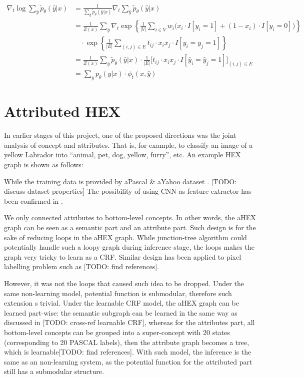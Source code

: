 \documentclass[11pt,a4paper]{article}
\begin{document}
\begin{align*}
\nabla_t\log\sum_{\hat{y}}\tilde{p}_\theta(\hat{y}|x)&=\frac{1}{\sum_{\hat{y}}\tilde{p}_\theta(\hat{y}|x)}\nabla_t\sum_{\hat{y}}\tilde{p}_\theta(\hat{y}|x)\\
&=\frac{1}{Z(x)}\sum_{\hat{y}}\nabla_t\exp\left\{\frac{1}{|V|}\sum_{i\in V}w_i\big(x_i\cdot I[y_i=1]+(1-x_i)\cdot I[y_i=0]\big)\right\}\\
&\quad\cdot\exp\left\{\frac{1}{|E|}\sum_{(i,j)\in E}t_{ij}\cdot x_ix_j\cdot I[y_i=y_j=1]\right\}\\
&=\frac{1}{Z(x)}\sum_{\hat{y}}\tilde{p}_\theta(\hat{y}|x)\cdot\frac{1}{|E|}\Big[t_{ij}\cdot x_ix_j\cdot I[\hat{y}_i=\hat{y}_j=1]\Big]_{(i,j)\in E}\\
&=\sum_{\hat{y}}p_\theta(\hat{y}|x)\cdot\phi_t(x,\hat{y})
\end{align*}

\appendix
\section{Attributed HEX}

In earlier stages of this project, one of the proposed directions was the joint analysis of concept and attributes. That is, for example, to classify an image of a yellow Labrador into ``animal, pet, dog, yellow, furry'', etc. An example HEX graph is shown as follows:

While the training data is provided by aPascal \& aYahoo dataset \cite{farhadi2009describing}. [TODO: discuss dataset properties] The possibility of using CNN as feature extractor has been confirmed in \cite{razavian2014cnn}.

We only connected attributes to bottom-level concepts. In other words, the aHEX graph can be seen as a semantic part and an attribute part. Such design is for the sake of reducing loops in the aHEX graph. While junction-tree algorithm could potentially handle such a loopy graph during inference stage, the loops makes the graph very tricky to learn as a CRF. Similar design has been applied to pixel labelling problem such as [TODO: find references].

However, it was not the loops that caused such idea to be dropped. Under the same non-learning model, potential function is submodular, therefore such extension s trivial. Under the learnable CRF model, the aHEX graph can be learned part-wise: the semantic subgraph can be learned in the same way as discussed in [TODO: cross-ref learnable CRF], whereas for the attributes part, all bottom-level concepts can be grouped into a super-concept with 20 states (corresponding to 20 PASCAL labels), then the attribute graph becomes a tree, which is learnable[TODO: find references]. With such model, the inference is the same as an non-learning system, as the potential function for the attributed part still has a submodular structure.
\end{document}
